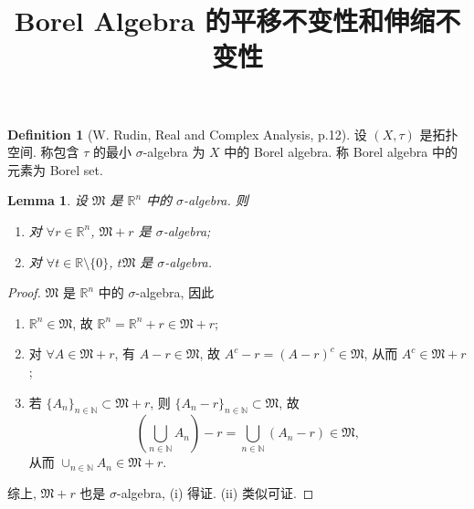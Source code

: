 \documentclass[a4paper,11pt]{article}
\title{Borel Algebra 的平移不变性和伸缩不变性}
\newtheorem{lemma}[theorem]{Lemma}
\theoremstyle{definition}
\newtheorem{definition}[theorem]{Definition}
\begin{document}
\maketitle

\begin{definition}[W. Rudin, Real and Complex Analysis, p.12]
    设 $ (X, \tau) $ 是拓扑空间. 称包含 $ \tau $ 的最小 $ \sigma $-algebra 为 $ X $ 中的 Borel algebra. 
    称 Borel algebra 中的元素为 Borel set.
\end{definition}

\begin{lemma} \label{lem}
    设 $ \mathfrak{M} $ 是 $ \mathbb{R}^n $ 中的 $ \sigma $-algebra. 则
    \begin{enumerate}[{\rm (i)}]
        \item 对 $ \forall r \in \mathbb{R}^n $, $ \mathfrak{M} + r $ 是 $ \sigma $-algebra;
        \item 对 $ \forall t \in \mathbb{R} \setminus \{0\} $, $ t\mathfrak{M} $ 是 $ \sigma $-algebra.
    \end{enumerate}
\end{lemma}

\begin{proof}
    $ \mathfrak{M} $ 是 $ \mathbb{R}^n $ 中的 $ \sigma $-algebra, 因此
    
    \begin{enumerate}[{\rm (i)}]
        \item $ \mathbb{R}^n \in \mathfrak{M} $, 故 $ \mathbb{R}^n = \mathbb{R}^n + r \in \mathfrak{M} + r $;
        
        \item 对 $ \forall A \in \mathfrak{M} + r $, 有 $ A - r \in \mathfrak{M} $, 故
        $ A^c - r = (A - r)^c \in \mathfrak{M} $, 从而 $ A^c \in \mathfrak{M} + r $;
        
        \item 若 $ \{A_n\}_{n \in \mathbb{N}} \subset \mathfrak{M} + r $, 则
        $ \{A_n - r \}_{n \in \mathbb{N}} \subset \mathfrak{M} $, 故
        $$ 
            \left( \bigcup_{n \in \mathbb{N}} A_n \right) - r 
                = \bigcup_{n \in \mathbb{N}} (A_n - r) \in \mathfrak{M},
        $$
        从而 $ \cup_{n \in \mathbb{N}} A_n \in \mathfrak{M} + r $.
    \end{enumerate}
    
    综上, $ \mathfrak{M} + r $ 也是 $ \sigma $-algebra, (i) 得证. 
    (ii) 类似可证.
\end{proof}
\end{document}
